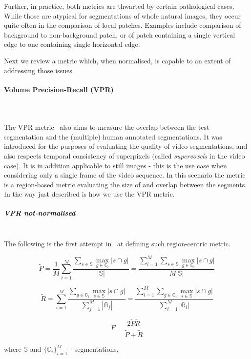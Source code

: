 Further, in practice, both metrics are thwarted by certain pathological cases. While those are atypical for segmentations of whole natural images, they occur quite often in the comparison of local patches. Examples include comparison of background to non-background patch, or of patch containing a single vertical edge to one containing single horizontal edge. 

Next we review a metric which, when normalised, is capable to an extent of addressing those issues.

\paragraph{Volume Precision-Recall (VPR)}\mbox{}\\\mbox{}\\
\label{sec:ch4-VPR-maths}
The VPR metric~\cite{Galasso13} also aims to measure the overlap between the test segmentation and the (multiple) human annotated segmentations. It was introduced for the purposes of evaluating the quality of video segmentations, and also respects temporal consistency of superpixels (called \textit{supervoxels} in the video case). It is in addition applicable to %
still images - this is the use case when considering only a single frame of the video sequence. In this scenario the metric is a region-based metric evaluating the size of and overlap between the segments. 
In the way just described is how we use the VPR metric.

\subparagraph*{VPR not-normalised}\mbox{}\\
The following is the first attempt in~\cite{Galasso13} at defining such region-centric metric.

\[
\tilde{P}=\frac{1}{M}\sum\limits _{i=1}^{M}\frac{\sum\limits _{s\in\mathbb{S}}\max\limits _{g\in\mathbb{G}_{i}}\left|s\cap g\right|}{\left|\mathbb{S}\right|}=\frac{\sum\limits _{i=1}^{M}\sum\limits _{s\in\mathbb{S}}\max\limits _{g\in\mathbb{G}_{i}}\left|s\cap g\right|}{M\left|\mathbb{S}\right|}
\]

\[
\tilde{R}=\sum\limits _{i=1}^{M}\frac{\sum\limits _{g\in\mathbb{G}_{i}}\max\limits _{s\in\mathbb{S}}\left|s\cap g\right|}{\sum\limits _{j=1}^{M}\left|\mathbb{G}_{j}\right|}=\frac{\sum\limits _{i=1}^{M}\sum\limits _{g\in\mathbb{G}_{i}}\max\limits _{s\in\mathbb{S}}\left|s\cap g\right|}{\sum\limits _{i=1}^{M}\left|\mathbb{G}_{i}\right|}
\]


\[
\tilde{F}=\frac{2\tilde{P}\tilde{R}}{\tilde{P}+\tilde{R}}
\]

where $\mathbb{S}$ and $\{\mathbb{G}_{i}\}_{i=1}^{M}$ - segmentations,

